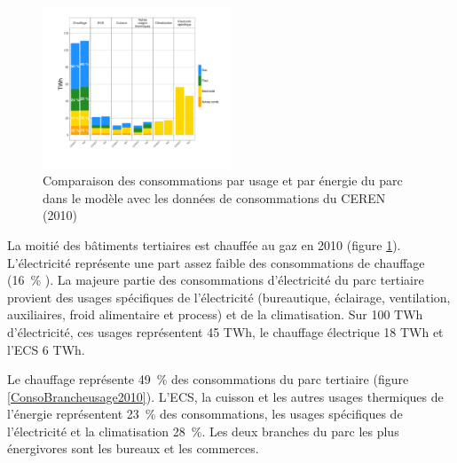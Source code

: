 \documentclass[10.5pt,a4paper]{article}
\begin{document}
{\begin{figure}[h!]
\centering
\caption{Comparaison des consommations par usage et par énergie du parc dans le modèle avec les données de consommations du CEREN (2010) }\label{CompConsousage2010}
\includegraphics[width = 0.5\textwidth]{CompConsousage2010}
\end{figure}

La moitié des bâtiments tertiaires est chauffée au gaz en 2010 (figure \ref{CompConsousage2010}). L'électricité représente une part assez faible des consommations de chauffage (16~\% ). 
La majeure partie des consommations d'électricité du parc tertiaire provient des usages spécifiques de l'électricité (bureautique, éclairage, ventilation, auxiliaires, froid alimentaire et process) et de la climatisation. Sur 100 TWh d'électricité, ces usages représentent 45 TWh, le chauffage électrique 18 TWh et l'ECS 6 TWh.

Le chauffage représente 49~\% des consommations du parc tertiaire (figure \ref{ConsoBrancheusage2010}). L'ECS, la cuisson et les autres usages thermiques de l'énergie représentent 23~\% des consommations, les usages spécifiques de l'électricité et la climatisation 28~\%. Les deux branches du parc les plus énergivores sont les bureaux et les commerces. 

}
\end{document}
